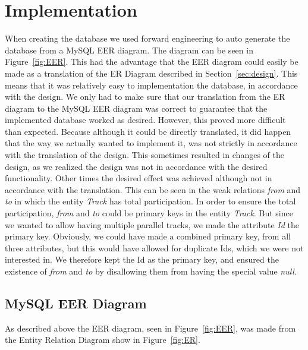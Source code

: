\section{Implementation} \label{sec:implementation}

When creating the database we used forward engineering to auto generate the 
database from a MySQL EER diagram. The diagram can be seen in 
Figure~\ref{fig:EER}. This had the advantage that the EER diagram could easily 
be made as a translation of the ER Diagram described in 
Section~\ref{sec:design}. This means that it was relatively easy to 
implementation the database, in accordance with the design. We only had to make 
sure that our translation from the ER diagram to the MySQL EER diagram was 
correct to guarantee that the implemented database worked as desired. However, 
this proved more difficult than expected. Because although it could be directly 
translated, it did happen that the way we actually wanted to implement it, was 
not strictly in accordance with the translation of the design. This sometimes 
resulted in changes of the design, as we realized the design was not in 
accordance with the desired functionality. Other times the desired effect was 
achieved although not in accordance with the translation. This can be seen in 
the weak relations \emph{from} and \emph{to} in which the entity \emph{Track} 
has total participation. In order to ensure the total participation, 
\emph{from} and \emph{to} could be primary keys in the entity \emph{Track}. But 
since we wanted to allow having multiple parallel tracks, we made the attribute 
\emph{Id} the primary key. Obviously, we could have made a combined primary 
key, from all three attributes, but this would have allowed for duplicate Ids, 
which we were not interested in. We therefore kept the Id as the primary key, 
and ensured the existence of \emph{from} and \emph{to} by disallowing them from 
having the special value \emph{null}.

\subsection{MySQL EER Diagram}

As described above the EER diagram, seen in Figure~\ref{fig:EER}, was made from 
the Entity Relation Diagram show in Figure~\ref{fig:ER}.

